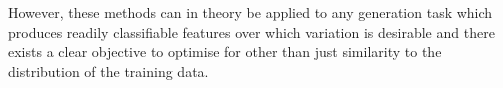 \documentclass{article}
\begin{document}
However, these methods can in theory be applied to any generation task which produces readily classifiable features over which variation is desirable and there exists a clear objective to optimise for other than just similarity to the distribution of the training data. 




\end{document}
